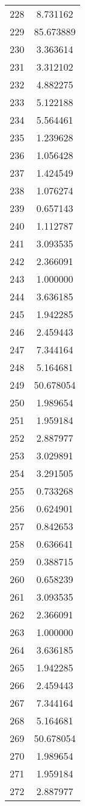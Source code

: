 \documentclass[12pt]{article}
\begin{document}
\begin{longtable}{@{}cc@{}}
228 & 8.731162 \\
229 & 85.673889 \\
230 & 3.363614 \\
231 & 3.312102 \\
232 & 4.882275 \\
233 & 5.122188 \\
234 & 5.564461 \\
235 & 1.239628 \\
236 & 1.056428 \\
237 & 1.424549 \\
238 & 1.076274 \\
239 & 0.657143 \\
240 & 1.112787 \\
241 & 3.093535 \\
242 & 2.366091 \\
243 & 1.000000 \\
244 & 3.636185 \\
245 & 1.942285 \\
246 & 2.459443 \\
247 & 7.344164 \\
248 & 5.164681 \\
249 & 50.678054 \\
250 & 1.989654 \\
251 & 1.959184 \\
252 & 2.887977 \\
253 & 3.029891 \\
254 & 3.291505 \\
255 & 0.733268 \\
256 & 0.624901 \\
257 & 0.842653 \\
258 & 0.636641 \\
259 & 0.388715 \\
260 & 0.658239 \\
261 & 3.093535 \\
262 & 2.366091 \\
263 & 1.000000 \\
264 & 3.636185 \\
265 & 1.942285 \\
266 & 2.459443 \\
267 & 7.344164 \\
268 & 5.164681 \\
269 & 50.678054 \\
270 & 1.989654 \\
271 & 1.959184 \\
272 & 2.887977 \\

\end{longtable}
\end{document}
